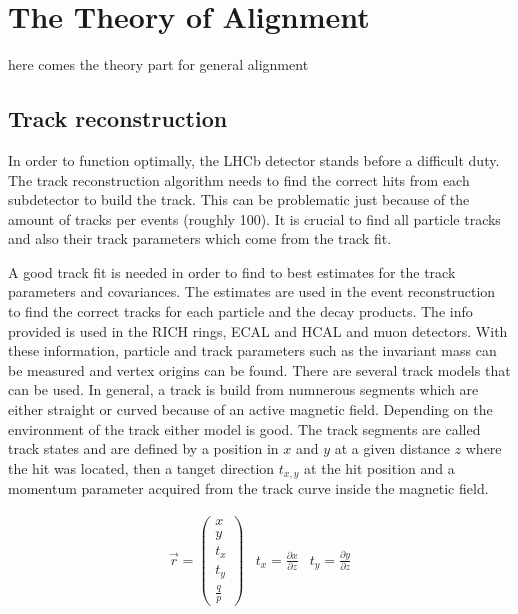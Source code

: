 \chapter{The Theory of Alignment}
\label{sec:alignTheory}

here comes the theory part for general alignment

\section{Track reconstruction}
\label{sec:kalman}

In order to function optimally, the LHCb detector stands before a difficult duty.
The track reconstruction algorithm needs to find the correct hits from each subdetector to build the track. This can be problematic just because of the amount of tracks per events (roughly 100).
It is crucial to find all particle tracks and also their track parameters which come from the track fit.


A good track fit is needed in order to find to best estimates for the track parameters and covariances. The estimates are used in the event reconstruction to find the correct tracks for each particle and the decay products. The info provided is used in the RICH rings, ECAL and HCAL and muon detectors. With these information, particle and track parameters such as the invariant mass can be measured and vertex origins can be found.
There are several track models that can be used. In general, a track is build from numnerous segments which are either straight or curved because of an active magnetic field. Depending on the environment of the track either model is good.
The track segments are called track states and are defined by a position in $x$ and $y$ at a given distance $z$ where the hit was located, then a tanget direction $t_{x,y}$ at the hit position and a momentum parameter acquired from the track curve inside the magnetic field.\cite{VanTilburg}

\begin{align}
  \vec{r} = \left(\begin{array}{c} x \\ y \\ t_x \\ t_y \\ \frac{q}{p}\end{array}\right) & t_x = \frac{\partial x}{\partial z} & t_y = \frac{\partial y}{\partial z}
\end{align}

